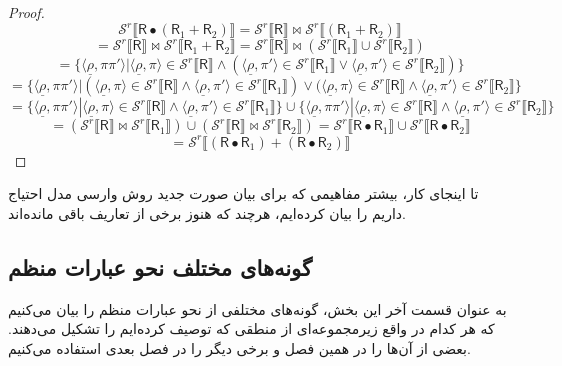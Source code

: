 \begin{proof}
	$$\mathcal{S}^r \llbracket \mathsf{R}\bullet (\mathsf{R}_1 + \mathsf{R}_2) \rrbracket =\mathcal{S}^r \llbracket \mathsf{R} \rrbracket \Join \mathcal{S}^r \llbracket (\mathsf{R}_1+\mathsf{R}_2) \rrbracket$$
	$$=\mathcal{S}^r \llbracket \mathsf{R} \rrbracket \Join \mathcal{S}^r \llbracket \mathsf{R}_1+\mathsf{R}_2 \rrbracket=\mathcal{S}^r \llbracket \mathsf{R} \rrbracket \Join (\mathcal{S}^r \llbracket \mathsf{R}_1 \rrbracket \cup \mathcal{S}^r\llbracket \mathsf{R}_2 \rrbracket)$$
	$$= \{ \langle \underline{\rho}, \pi \pi' \rangle| \langle \underline{\rho}, \pi \rangle \in \mathcal{S}^r \llbracket \mathsf{R} \rrbracket \land (\langle \underline{\rho},\pi'\rangle \in \mathcal{S}^r \llbracket \mathsf{R}_1 \rrbracket\lor \langle \underline{\rho} , \pi' \rangle \in \mathcal{S}^r \llbracket \mathsf{R}_2 \rrbracket) \}$$
	$$=\{ \langle \underline{\rho}, \pi \pi' \rangle| (\langle \underline{\rho}, \pi \rangle \in \mathcal{S}^r \llbracket \mathsf{R} \rrbracket \land \langle \underline{\rho},\pi'\rangle \in \mathcal{S}^r \llbracket \mathsf{R}_1 \rrbracket) \lor (\langle \underline{\rho}, \pi \rangle \in \mathcal{S}^r \llbracket \mathsf{R} \rrbracket \land \langle \underline{\rho} , \pi' \rangle \in \mathcal{S}^r \llbracket \mathsf{R}_2 \rrbracket  \}$$
	$$=\{ \langle \underline{\rho}, \pi \pi' \rangle|\langle \underline{\rho}, \pi \rangle \in \mathcal{S}^r \llbracket \mathsf{R} \rrbracket \land \langle \underline{\rho},\pi'\rangle \in \mathcal{S}^r \llbracket \mathsf{R}_1 \rrbracket\} \cup
	\{ \langle \underline{\rho}, \pi \pi' \rangle|\langle \underline{\rho}, \pi \rangle \in \mathcal{S}^r \llbracket \mathsf{R} \rrbracket \land \langle \underline{\rho},\pi'\rangle \in \mathcal{S}^r \llbracket \mathsf{R}_2 \rrbracket\}$$
	$$=(\mathcal{S}^r \llbracket \mathsf{R} \rrbracket \Join \mathcal{S}^r \llbracket \mathsf{R}_1\rrbracket ) \cup (\mathcal{S}^r \llbracket \mathsf{R} \rrbracket \Join \mathcal{S}^r \llbracket \mathsf{R}_2 \rrbracket)=
	\mathcal{S}^r \llbracket \mathsf{R\bullet R}_1 \rrbracket \cup \mathcal{S}^r \llbracket \mathsf{R\bullet R}_2 \rrbracket$$
	$$=\mathcal{S}^r \llbracket (\mathsf{R \bullet R}_1) + (\mathsf{R \bullet R}_2) \rrbracket $$
\end{proof}
تا اینجای کار، بیشتر مفاهیمی که برای بیان صورت جدید روش وارسی مدل احتیاج داریم را بیان کرده‌ایم، هرچند که هنوز برخی از تعاریف باقی مانده‌اند.
\subsection{گونه‌های مختلف نحو عبارات منظم}
به عنوان قسمت آخر این بخش، گونه‌های مختلفی از نحو عبارات منظم را بیان می‌کنیم که هر کدام در واقع زیرمجموعه‌ای از منطقی که توصیف کرده‌ایم را تشکیل می‌دهند. بعضی از آن‌ها را در همین فصل و برخی دیگر را در فصل بعدی استفاده می‌کنیم.

